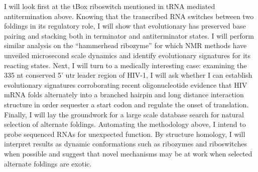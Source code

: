 I will look first at the tBox riboswitch mentioned in tRNA mediated antitermination above. Knowing that the transcribed RNA switches between two foldings in its regulatory role, I will show that evolutionary has preserved base pairing and stacking both in terminator and antiterminator states. I will perform similar analysis on the ``hammerhead ribozyme''\cite{RefWorks:18} for which NMR methods have unveiled microsecond scale dynamics and identify evolutionary signatures for its reacting states. Next, I will turn to a medically interesting case: examining the 335 nt conserved 5' utr leader region of HIV-1, I will ask whether I can establish evolutionary signatures corroborating recent oligonucleotide evidence\cite{RefWorks:19} that HIV mRNA folds alternately into a branched hairpin and long distance interaction structure in order sequester a start codon and regulate the onset of translation.
Finally, I will lay the groundwork for a large scale database search for natural selection of alternate foldings. Automating the methodology above, I intend to probe sequenced RNAs for unexpected function. By structure homology, I will interpret results as dynamic conformations such as ribozymes and riboswitches when possible and suggest that novel mechanisms may be at work when selected alternate foldings are exotic.